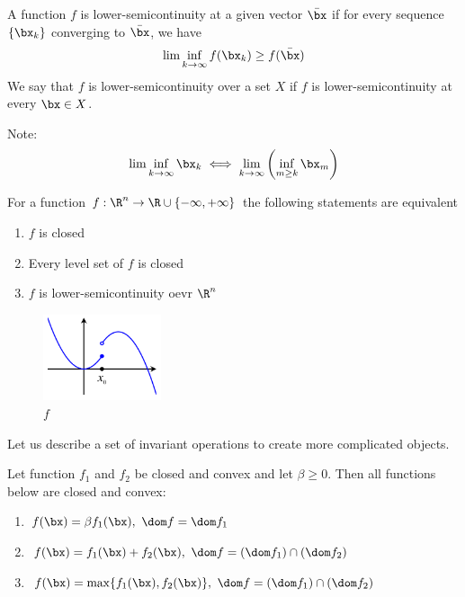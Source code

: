 \begin{definition}
    A function $f$ is lower-semicontinuity at a given vector $\bar\bx$ if for every sequence $\{ \bx_k \}$ converging to $\bar\bx$, we have
    \begin{align*}
        \lim\inf_{k\to\infty} f(\bx_k)\ge f(\bar\bx)
    \end{align*}
    We say that $f$ is lower-semicontinuity over a set $X$ if $f$ is lower-semicontinuity at every $\bx\in X$.
\end{definition}

Note:
\begin{align*}
    \lim\inf_{k\to\infty}\bx_k\iff \lim_{k\to\infty}\left( \inf_{m\ge k}\bx_m \right)
\end{align*}

\begin{theorem}
    For a function $f:\R^n\to\R\cup\{ -\infty,+\infty \}$ the following statements are equivalent
    \begin{enumerate}
        \item $f$ is closed
        \item Every level set of $f$ is closed
        \item $f$ is lower-semicontinuity oevr $\R^n$
    \end{enumerate}
\end{theorem}

\begin{figure}[!htb]
    \centering
    \includegraphics[width=0.309\textwidth]{pic/Opt5/Invariant Operations}
    \caption{$f$}
\end{figure}


Let us describe a set of invariant operations to create more complicated objects. 
\begin{theorem}
    Let function $f_1$ and $f_2$ be closed and convex and let $\beta\ge 0$. Then all functions below are closed and convex:
    \begin{enumerate}
        \item $f(\bx)=\beta f_1(\bx),\ \dom f=\dom f_1$
        \item $f(\bx)=f_1(\bx)+f_2(\bx),\ \dom f=(\dom f_1)\cap (\dom f_2)$
        \item $f(\bx)=\max\{ f_1(\bx),f_2(\bx) \},\ \dom f=(\dom f_1)\cap (\dom f_2)$
    \end{enumerate}
\end{theorem}

